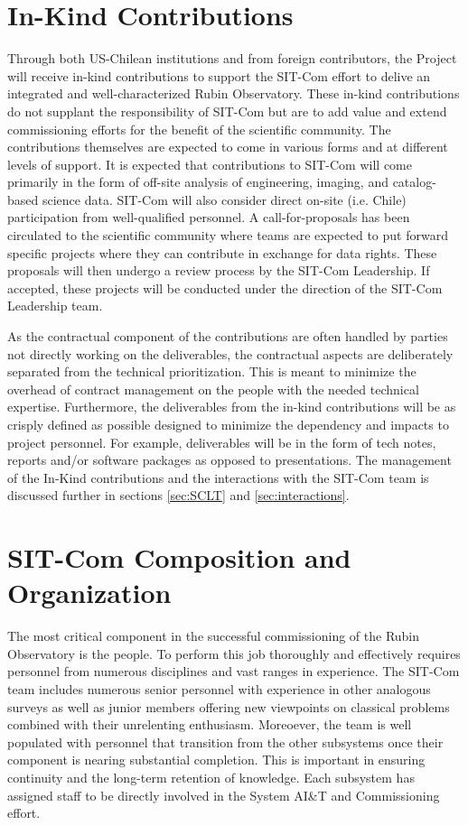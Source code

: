 \documentclass[SE,lsstdraft,authoryear,toc]{lsstdoc}
\begin{document}
\section{In-Kind Contributions}
\label{sec:in_kind}

Through both US-Chilean institutions and from foreign contributors, the Project will receive in-kind contributions to support the SIT-Com effort to delive an integrated and well-characterized Rubin Observatory.
These in-kind contributions do not supplant the responsibility of SIT-Com but are to add value and extend commissioning efforts for the benefit of the scientific community.
The contributions themselves are expected to come in various forms and at different levels of support.
It is expected that contributions to SIT-Com will come primarily in the form of off-site analysis of engineering, imaging, and catalog-based science data.
SIT-Com will also consider direct on-site (i.e. Chile) participation from well-qualified personnel.
A call-for-proposals has been circulated to the scientific community where teams are expected to put forward specific projects where they can contribute in exchange for data rights.
These proposals will then undergo a review process by the SIT-Com Leadership.
If accepted, these projects will be conducted under the direction of the SIT-Com Leadership team.

As the contractual component of the contributions are often handled by parties not directly working on the deliverables, the contractual aspects are deliberately separated from the technical prioritization.
This is meant to minimize the overhead of contract management on the people with the needed technical expertise.
Furthermore, the deliverables from the in-kind contributions will be as crisply defined as possible designed to minimize the dependency and impacts to project personnel.
For example, deliverables will be in the form of tech notes, reports and/or software packages as opposed to presentations.
The management of the In-Kind contributions and the interactions with the SIT-Com team is discussed further in sections \ref{sec:SCLT} and \ref{sec:interactions}.

\section{SIT-Com Composition and Organization}
\label{sec:comp_and_org}

The most critical component in the successful commissioning of the Rubin Observatory is the people.
To perform this job thoroughly and effectively requires personnel from numerous disciplines and vast ranges in experience.
The SIT-Com team includes numerous senior personnel with experience in other analogous surveys as well as junior members offering new viewpoints on classical problems combined with their unrelenting enthusiasm.
Moreoever, the team is well populated with personnel that transition from the other subsystems once their component is nearing substantial completion.
This is important in ensuring continuity and the long-term retention of knowledge.
Each subsystem has assigned staff to be directly involved in the System AI\&T and Commissioning effort.
\end{document}
